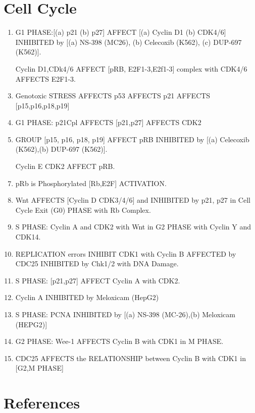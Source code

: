

\section{Cell Cycle}

\begin{enumerate}
	\item G1 PHASE:[(a) p21 (b) p27] AFFECT [(a) Cyclin D1 (b) CDK4/6] INHIBITED by [(a) NS-398 (MC26), (b) Celecoxib (K562), (c) DUP-697 (K562)]. \cite{key4000}
	\item [Cyclin D1,CDk4/6] AFFECT [pRB, E2F1-3,E2f1-3] complex with CDK4/6 AFFECTS E2F1-3. \cite{key4000}
	\item Genotoxic STRESS AFFECTS p53 AFFECTS p21 AFFECTS [p15,p16,p18,p19] \cite{key4000}
	\item G1 PHASE: p21Cpl AFFECTS [p21,p27] AFFECTS CDK2 \cite{key4000}
	\item GROUP [p15, p16, p18, p19] AFFECT pRB INHIBITED by [(a) Celecoxib (K562),(b) DUP-697 (K562)]. \cite{key4000} 
	\item [Cyclin E CDK2] AFFECT pRB.  \cite{key4000}
	\item pRb is Phosphorylated [Rb,E2F] ACTIVATION. \cite{key4000}
	\item Wnt AFFECTS [Cyclin D CDK3/4/6] and INHIBITED by p21, p27 in Cell Cycle Exit (G0) PHASE with Rb Complex. \cite{key4000}
	\item S PHASE: Cyclin A and CDK2 with Wnt in G2 PHASE with Cyclin Y and CDK14.  \cite{key4000}
	\item REPLICATION errors INHIBIT CDK1 with Cyclin B AFFECTED by CDC25 INHIBITED by Chk1/2 with DNA Damage. \cite{key4000}
	\item S PHASE: [p21,p27] AFFECT Cyclin A with CDK2. \cite{key4000}
	\item Cyclin A INHIBITED by Meloxicam (HepG2) \cite{key4000}
	\item S PHASE: PCNA INHIBITED by [(a) NS-398 (MC-26),(b) Meloxicam (HEPG2)] \cite{key4000}
	\item G2 PHASE: Wee-1 AFFECTS Cyclin B with CDK1 in M PHASE.  \cite{key4000}
	\item CDC25 AFFECTS the RELATIONSHIP between Cyclin B with CDK1 in [G2,M PHASE] \cite{key4000}	
\end{enumerate}


\section{References}


